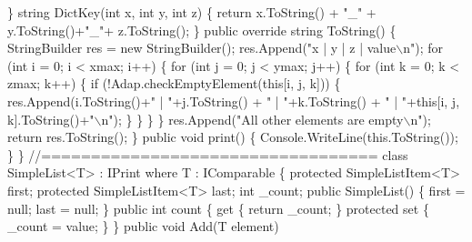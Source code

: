 \begin{DoxyCode}
        \}
        \textcolor{keywordtype}{string} DictKey(\textcolor{keywordtype}{int} x, \textcolor{keywordtype}{int} y, \textcolor{keywordtype}{int} z)
        \{
            \textcolor{keywordflow}{return} x.ToString() + \textcolor{stringliteral}{"\_"} + y.ToString()+\textcolor{stringliteral}{"\_"}+ z.ToString();
        \}
        \textcolor{keyword}{public} \textcolor{keyword}{override} \textcolor{keywordtype}{string} ToString()
        \{
            StringBuilder res = \textcolor{keyword}{new} StringBuilder();
            res.Append(\textcolor{stringliteral}{"x | y | z | value\(\backslash\)n"});
            \textcolor{keywordflow}{for} (\textcolor{keywordtype}{int} i = 0; i < xmax; i++)
            \{
                \textcolor{keywordflow}{for} (\textcolor{keywordtype}{int} j = 0; j < ymax; j++)
                \{
                    \textcolor{keywordflow}{for} (\textcolor{keywordtype}{int} k = 0; k < zmax; k++)
                    \{
                        \textcolor{keywordflow}{if} (!Adap.checkEmptyElement(\textcolor{keyword}{this}[i, j, k]))
                        \{
                            res.Append(i.ToString()+\textcolor{stringliteral}{" | "}+j.ToString() + \textcolor{stringliteral}{" | "}+k.ToString() + \textcolor{stringliteral}{" | "}+\textcolor{keyword}{this}[i,
       j, k].ToString()+\textcolor{stringliteral}{"\(\backslash\)n"});
                        \}
                    \}
                \}
            \}
            res.Append(\textcolor{stringliteral}{"All other elements are empty\(\backslash\)n"});
            \textcolor{keywordflow}{return} res.ToString();
        \}
        \textcolor{keyword}{public} \textcolor{keywordtype}{void} print()
        \{
            Console.WriteLine(this.ToString());
        \}
    \}
    \textcolor{comment}{//==================================}
    \textcolor{keyword}{class }SimpleList<T> : IPrint
        where T : IComparable
    \{
        \textcolor{keyword}{protected} SimpleListItem<T> first;
        \textcolor{keyword}{protected} SimpleListItem<T> last;
        \textcolor{keywordtype}{int} \_count;
        \textcolor{keyword}{public} SimpleList()
        \{
            first = null;
            last = null;
        \}
        \textcolor{keyword}{public} \textcolor{keywordtype}{int} count
        \{
            \textcolor{keyword}{get}
            \{
                \textcolor{keywordflow}{return} \_count;
            \}
            \textcolor{keyword}{protected} \textcolor{keyword}{set}
            \{
                \_count = value;
            \}
        \}
        \textcolor{keyword}{public} \textcolor{keywordtype}{void} Add(T element)

\end{DoxyCode}
